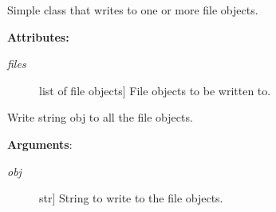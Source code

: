 \documentclass[letterpaper,10pt,english]{sphinxmanual}
\begin{document}

\begin{fulllineitems}
\label{index:encore.utils.Tee}
Simple class that writes to one or more file objects.

\textbf{Attributes:}
\begin{description}
\item[{\emph{files}}] \leavevmode{[}list of file objects{]}
File objects to be written to.

\end{description}

\begin{fulllineitems}
\label{index:encore.utils.Tee.write}
Write string obj to all the file objects.

\textbf{Arguments}:
\begin{description}
\item[{\emph{obj}}] \leavevmode{[}str{]}
String to write to the file objects.

\end{description}

\end{fulllineitems}


\end{fulllineitems}

\end{document}
